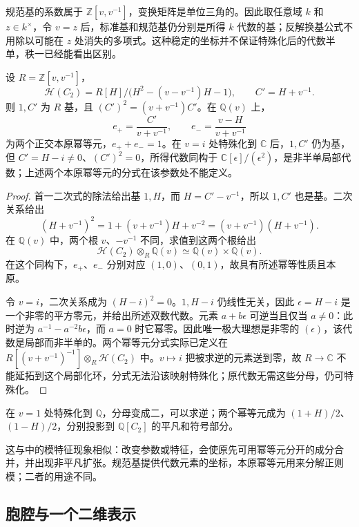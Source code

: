 \ProseParagraphBreak
规范基的系数属于 \(\mathbb Z[v,v^{-1}]\)，变换矩阵是单位三角的。因此取任意域 \(k\) 和 \(z\in k^\times\)，令 \(v=z\) 后，标准基和规范基仍分别是所得 \(k\) 代数的基；反解换基公式不用除以可能在 \(z\) 处消失的多项式。这种稳定的坐标并不保证特殊化后的代数半单，秩一已经能看出区别。

\begin{proposition}\label{b5:prop:hecke-rank-one-specialization}
	设 \(R=\mathbb Z[v,v^{-1}]\)，
	\[
		\mathcal H(C_2)=R[H]/\bigl(H^2-(v-v^{-1})H-1\bigr), \qquad C'=H+v^{-1}.
	\]
	则 \(1,C'\) 为 \(R\) 基，且 \((C')^2=(v+v^{-1})C'\)。在 \(\mathbb Q(v)\) 上，
	\[
		e_+=\frac{C'}{v+v^{-1}},\qquad e_-=\frac{v-H}{v+v^{-1}}
	\]
	为两个正交本原幂等元，\(e_++e_-=1\)。在 \(v=i\) 处特殊化到 \(\mathbb C\) 后，\(1,C'\) 仍为基，但 \(C'=H-i\ne0\)、\((C')^2=0\)，所得代数同构于 \(\mathbb C[\epsilon]/(\epsilon^2)\)，是非半单局部代数；上述两个本原幂等元的分式在该参数处不能定义。
\end{proposition}
\begin{proof}
	首一二次式的除法给出基 \(1,H\)，而 \(H=C'-v^{-1}\)，所以 \(1,C'\) 也是基。二次关系给出
	\[
		(H+v^{-1})^2 =1+(v+v^{-1})H+v^{-2} =(v+v^{-1})(H+v^{-1}).
	\]
	在 \(\mathbb Q(v)\) 中，两个根 \(v\)、\(-v^{-1}\) 不同，求值到这两个根给出
	\[
		\mathcal H(C_2)\otimes_R\mathbb Q(v) \simeq\mathbb Q(v)\times\mathbb Q(v).
	\]
	在这个同构下，\(e_+\)、\(e_-\) 分别对应 \((1,0)\)、\((0,1)\)，故具有所述幂等性质且本原。

	令 \(v=i\)，二次关系成为 \((H-i)^2=0\)。\(1,H-i\) 仍线性无关，因此 \(\epsilon=H-i\) 是一个非零的平方零元，并给出所述双数代数。元素 \(a+b\epsilon\) 可逆当且仅当 \(a\ne0\)：此时逆为 \(a^{-1}-a^{-2}b\epsilon\)，而 \(a=0\) 时它幂零。因此唯一极大理想是非零的 \((\epsilon)\)，该代数是局部而非半单的。两个幂等元分式实际已定义在 \(R[(v+v^{-1})^{-1}]\otimes_R\mathcal H(C_2)\) 中。\(v\mapsto i\) 把被求逆的元素送到零，故 \(R\to\mathbb C\) 不能延拓到这个局部化环，分式无法沿该映射特殊化；原代数无需这些分母，仍可特殊化。
\end{proof}

在 \(v=1\) 处特殊化到 \(\mathbb Q\)，分母变成二，可以求逆；两个幂等元成为 \((1+H)/2\)、\((1-H)/2\)，分别投影到 \(\mathbb Q[C_2]\) 的平凡和符号部分。

这与中的模特征现象相似：改变参数或特征，会使原先可用幂等元分开的成分合并，并出现非平凡扩张。规范基提供代数元素的坐标，本原幂等元用来分解正则模；二者的用途不同。

\subsection{胞腔与一个二维表示}
\label{b5:subsec:A04:03}

